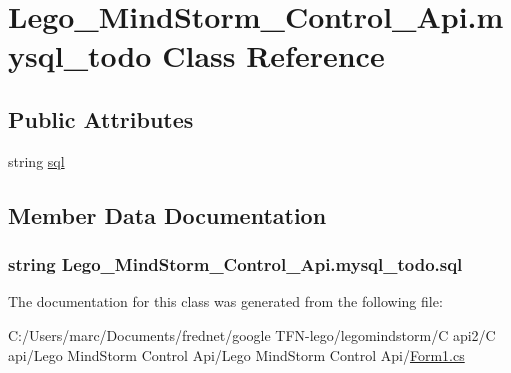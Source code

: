 \hypertarget{class_lego___mind_storm___control___api_1_1mysql__todo}{
\section{Lego\_\-MindStorm\_\-Control\_\-Api.mysql\_\-todo Class Reference}
\label{class_lego___mind_storm___control___api_1_1mysql__todo}
}
\subsection*{Public Attributes}
\begin{CompactItemize}
\item 
string \hyperlink{class_lego___mind_storm___control___api_1_1mysql__todo_a21b577fe501389b703a650953d6fae6}{sql}
\end{CompactItemize}


\subsection{Member Data Documentation}
\hypertarget{class_lego___mind_storm___control___api_1_1mysql__todo_a21b577fe501389b703a650953d6fae6}{
\subsubsection[{sql}]{\setlength{\rightskip}{0pt plus 5cm}string {\bf Lego\_\-MindStorm\_\-Control\_\-Api.mysql\_\-todo.sql}}}
\label{class_lego___mind_storm___control___api_1_1mysql__todo_a21b577fe501389b703a650953d6fae6}




The documentation for this class was generated from the following file:\begin{CompactItemize}
\item 
C:/Users/marc/Documents/frednet/google TFN-lego/legomindstorm/C api2/C api/Lego MindStorm Control Api/Lego MindStorm Control Api/\hyperlink{_form1_8cs}{Form1.cs}\end{CompactItemize}
